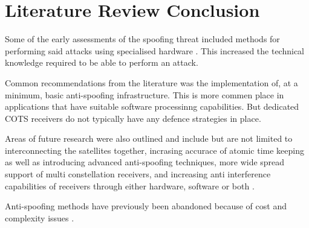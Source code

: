 \renewcommand{\arraystretch}{1.2}
\begin{table}[ht]
    \begin{center}
        \caption{Summary of Spoofing Mitigation Methods from \cite{RN6}}
        \label{tab:SpoofMitigateSum}
    \end{center}
\end{table}
\renewcommand{\arraystretch}{1}


\section{Literature Review Conclusion}
Some of the early assessments of the spoofing threat included methods for performing said attacks using specialised hardware \cite{RN23}. This increased the technical
knowledge required to be able to perform an attack.

Common recommendations from the literature was the implementation of, at a minimum, basic anti-spoofing infrastructure. This is more commen place in applications that
have suitable software processinng capabilities. But dedicated COTS receivers do not typically have any defence strategies in place.  

Areas of future research were also outlined and include but are not limited to interconnecting the satellites together, incrasing accurace of
atomic time keeping as well as introducing advanced anti-spoofing techniques, more wide spread support of multi constellation receivers, and increasing anti interference
capabilities of receivers through either hardware, software or both \cite{RN33}.

Anti-spoofing methods have previously been abandoned because of cost and complexity issues \cite{RN7}.